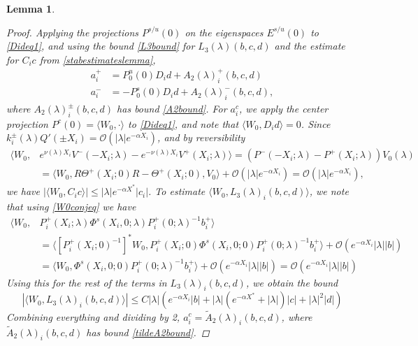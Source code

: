 \documentclass[10pt,reqno]{amsart}
\theoremstyle{plain}
\newtheorem{lemma}[theorem]{Lemma}
\theoremstyle{definition}
\theoremstyle{remark}
\numberwithin{theorem}{section}
\numberwithin{equation}{section}
\begin{document}
\begin{lemma}
\begin{proof}
Applying the projections $P^{s/u}(0)$ on the eigenspaces $E^{s/u}(0)$ to \eqref{Dideq1}, and using the bound \cref{L3bound} for $L_3(\lambda)(b, c, d)$ and the estimate for $C_i c$ from \cref{stabestimateslemma},
\begin{align*}
a_i^+ &= P_0^u(0) D_i d + A_2(\lambda)_i^+(b, c, d) \\
a_i^- &= -P_0^s(0) D_i d + A_2(\lambda)_i^-(b, c, d),
\end{align*}
where $A_2(\lambda)_i^\pm(b, c, d)$ has bound \cref{A2bound}. For $a_i^c$, we apply the center projection $P^c(0) = \langle W_0, \cdot \rangle$ to \eqref{Dideq1}, and note that $\langle W_0, D_i d\rangle = 0$. Since $k_i^\pm(\lambda)Q'(\pm X_i) = \mathcal{O}(|\lambda|e^{-\alpha X_i})$, and by reversibility
\begin{align*}
\langle W_0, &e^{\nu(\lambda) X_i} V^-(-X_i; \lambda) - e^{-\nu(\lambda) X_i} V^+(X_i; \lambda) \rangle = \left( P^-(-X_i; \lambda) - P^+(X_i; \lambda) \right) V_0(\lambda) \\
&= \langle W_0, R \Theta^+(X_i; 0) R - \Theta^+(X_i; 0), V_0 \rangle + \mathcal{O}(|\lambda|e^{-\alpha X_i}) = \mathcal{O}(|\lambda|e^{-\alpha X_i}),
\end{align*}
we have $|\langle W_0, C_i c\rangle| \leq |\lambda|e^{-\alpha X^*}|c_i|$. To estimate $\langle W_0, L_3(\lambda)_i(b,c,d) \rangle$, we note that using \cref{W0conjeq} we have
\begin{align*}
\langle W_0, &P_i^+(X_i; \lambda)\Phi^s(X_i, 0; \lambda) P_i^+(0; \lambda)^{-1} b_i^+ \rangle
\\
&= \langle [P_i^+(X_i; 0)^{-1}]^* W_0, P_i^+(X_i; 0)\Phi^s(X_i, 0; 0) P_i^+(0; \lambda)^{-1} b_i^+ \rangle + \mathcal{O}(e^{-\alpha X_i} |\lambda||b|) \\
&= \langle W_0, \Phi^s(X_i, 0; 0)  P_i^+(0; \lambda)^{-1} b_i^+ \rangle + \mathcal{O}(e^{-\alpha X_i} |\lambda||b|) = \mathcal{O}(e^{-\alpha X_i} |\lambda||b|)
\end{align*}
Using this for the rest of the terms in $L_3(\lambda)_i(b, c, d)$, we obtain the bound
\begin{equation}\label{W0L3bound}
|\langle W_0, L_3(\lambda)_i(b, c, d) \rangle| \leq C |\lambda| \left( e^{-\alpha X_i} |b| + |\lambda|(e^{-\alpha X^*}+ |\lambda|) |c| + |\lambda|^2 |d| \right)
\end{equation}
Combining everything and dividing by 2, $a_i^c = \tilde{A}_2(\lambda)_i(b, c, d)$, where $\tilde{A}_2(\lambda)_i(b, c, d)$ has bound \cref{tildeA2bound}.
\end{proof}
\end{lemma}
\end{document}
